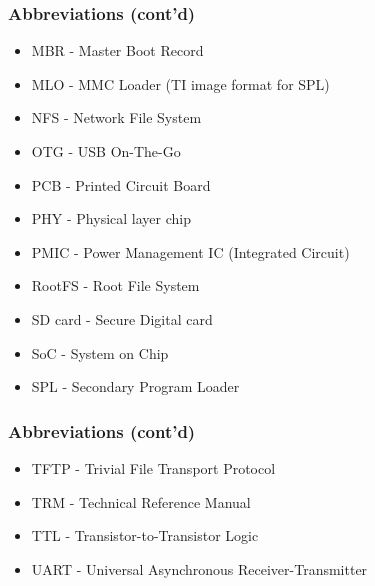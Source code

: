 \documentclass[aspectratio=169]{beamer}
\begin{document}
\begin{frame}
  \frametitle{Abbreviations (cont'd)}
  \begin{itemize}
    \item MBR - Master Boot Record
    \item MLO - MMC Loader (TI image format for SPL)
    \item NFS - Network File System
    \item OTG - USB On-The-Go
    \item PCB - Printed Circuit Board
    \item PHY - Physical layer chip
    \item PMIC - Power Management IC (Integrated Circuit)
    \item RootFS - Root File System
    \item SD card - Secure Digital card
    \item SoC - System on Chip
    \item SPL - Secondary Program Loader
  \end{itemize}
\end{frame}

\begin{frame}
  \frametitle{Abbreviations (cont'd)}
  \begin{itemize}
    \item TFTP - Trivial File Transport Protocol
    \item TRM - Technical Reference Manual
    \item TTL - Transistor-to-Transistor Logic
    \item UART - Universal Asynchronous Receiver-Transmitter
  \end{itemize}
\end{frame}
\end{document}
